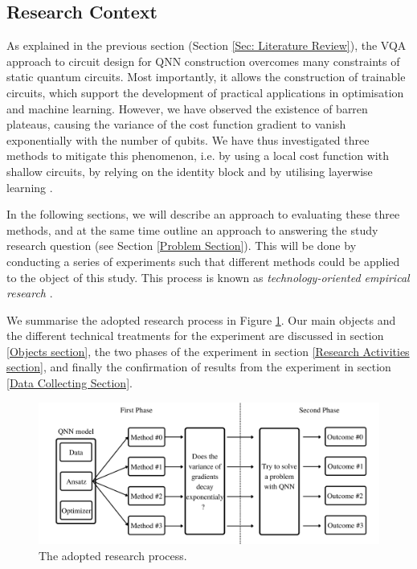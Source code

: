 \subsection{Research Context}

As explained in the previous section (Section \ref{Sec: Literature Review}), the VQA approach to circuit design for QNN construction overcomes many constraints of static quantum circuits. Most importantly, it allows the construction of trainable circuits, which support the development of practical applications in optimisation and machine learning.
However, we have observed the existence of barren plateaus, causing the variance of the cost function gradient to vanish exponentially with the number of qubits.
We have thus investigated three methods to mitigate this phenomenon, i.e. by using a local cost function with shallow circuits, by relying on the identity block and by utilising layerwise learning \cite{cerezoCostFunctionDependent2021, liuParameterInitializationMethod2021, skolikLayerwiseLearningQuantum2021}.

In the following sections, we will describe an approach to evaluating these three methods, and at the same time outline an approach to answering the study research question (see Section \ref{Problem Section}). This will be done by conducting a series of experiments such that different methods could be applied to the object of this study.
This process is known as \emph{technology-oriented empirical research} \cite[sect 2.4]{wohlinExperimentationSoftwareEngineering2012}.

We summarise the adopted research process in Figure \ref{Research Activities Figure}.
Our main objects and the different technical treatments for the experiment are discussed in section \ref{Objects section}, the two phases of the experiment in section \ref{Research Activities section}, and finally the confirmation of results from the experiment in section \ref{Data Collecting Section}.

\begin{figure}
    \centering
    \includegraphics[width=\linewidth]{./ResearchDesign/Appendices/ExperimentDiagram.png}
    \caption{
        The adopted research process.
    }
    \label{Research Activities Figure}
\end{figure}
